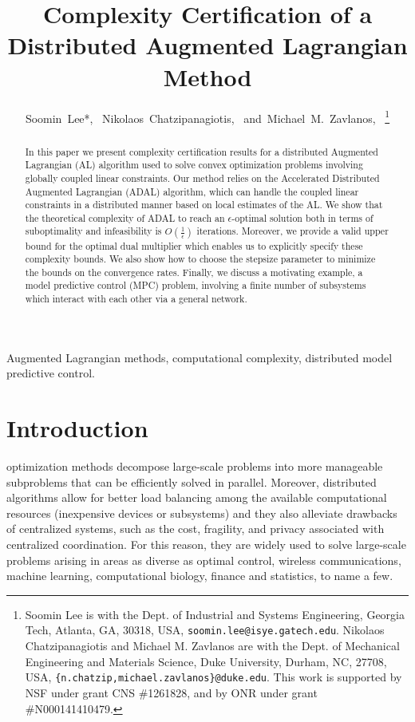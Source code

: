 \documentclass[doublecolumn]{IEEEtran}
\begin{document}
\title{Complexity Certification of a Distributed Augmented Lagrangian Method}

\author{Soomin~Lee*,~
Nikolaos~Chatzipanagiotis,~
and~Michael~M.~Zavlanos,~
\thanks{Soomin Lee is with the Dept. of Industrial and Systems Engineering, Georgia Tech, Atlanta, GA, 30318, USA, {\tt\footnotesize soomin.lee@isye.gatech.edu}.
Nikolaos Chatzipanagiotis and Michael M. Zavlanos are with the Dept. of Mechanical Engineering and Materials Science, Duke University, Durham, NC, 27708, USA, {\tt\footnotesize \{n.chatzip,michael.zavlanos\}@duke.edu}. This work is supported by NSF under grant CNS \#1261828, and by ONR under grant \#N000141410479.
}}

\maketitle

\begin{abstract}
In this paper we present complexity certification results for a distributed Augmented Lagrangian (AL) algorithm
used to solve convex optimization problems involving globally coupled linear constraints.
Our method relies on the Accelerated Distributed Augmented Lagrangian (ADAL) algorithm,
which can handle the coupled linear constraints in a distributed manner based on local estimates of the AL.
We show that
the theoretical complexity of ADAL
to reach an $\epsilon$-optimal solution both in terms of suboptimality and infeasibility is $O(\frac{1}{\epsilon})$ iterations. Moreover, we provide a valid upper bound for the optimal dual multiplier which enables us to explicitly specify these complexity bounds.
We also show how to choose the stepsize parameter to minimize the bounds on the convergence rates.
Finally, we discuss a motivating example, a model predictive control (MPC) problem, involving a finite number of subsystems which interact with each other via a general network.
\end{abstract}

\begin{IEEEkeywords}
Augmented Lagrangian methods, computational complexity,
distributed model predictive control.
\end{IEEEkeywords}

\section{Introduction}\label{sec_introduction}

 optimization methods
decompose large-scale problems into more manageable subproblems that can be efficiently solved in parallel. Moreover, distributed algorithms allow for better load balancing among the available computational resources (inexpensive devices or subsystems) and they also
alleviate drawbacks of centralized systems, such as the cost, fragility, and privacy associated with centralized coordination.
For this reason, they  are widely  used to solve  large-scale problems arising in areas as diverse as  optimal control, wireless communications,  machine learning, computational biology, finance and statistics, to name a few.
\end{document}
